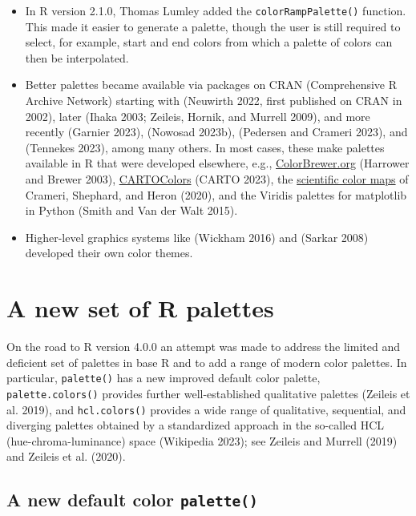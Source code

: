 \begin{itemize}
\item
  In R version 2.1.0, Thomas Lumley added the \texttt{colorRampPalette()} function.
  This made it easier to generate a palette, though the user is still required
  to select, for example, start and end colors from which
  a palette of colors can then be interpolated.
\item
  Better palettes became available via packages on CRAN
  (Comprehensive R Archive Network)
  starting with  (Neuwirth 2022, first published on CRAN in 2002),
  later
   (Ihaka 2003; Zeileis, Hornik, and Murrell 2009), and
  more recently
   (Garnier 2023),  (Nowosad 2023b),
   (Pedersen and Crameri 2023), and
   (Tennekes 2023),
  among many others. In most cases, these make palettes available in R that
  were developed elsewhere, e.g.,
  \href{https://ColorBrewer2.org/}{ColorBrewer.org} (Harrower and Brewer 2003),
  \href{https://carto.com/carto-colors/}{CARTOColors} (CARTO 2023),
  the \href{https://www.fabiocrameri.ch/colourmaps/}{scientific color maps} of Crameri, Shephard, and Heron (2020),
  and the Viridis palettes for matplotlib in Python (Smith and Van der Walt 2015).
\item
  Higher-level graphics systems
  like  (Wickham 2016) and  (Sarkar 2008)
  developed their own color themes.
\end{itemize}

\hypertarget{a-new-set-of-r-palettes}{%
\section{A new set of R palettes}\label{a-new-set-of-r-palettes}}

On the road to R version 4.0.0 an attempt was made to
address the limited and deficient set of palettes in base R
and to add a range of modern color palettes.
In particular, \texttt{palette()} has a new improved default color palette,
\texttt{palette.colors()} provides further well-established qualitative palettes (Zeileis et al. 2019), and
\texttt{hcl.colors()} provides a wide range of qualitative, sequential, and diverging palettes obtained by a standardized approach in
the so-called HCL (hue-chroma-luminance) space (Wikipedia 2023); see Zeileis and Murrell (2019) and Zeileis et al. (2020).

\hypertarget{a-new-default-color-palette}{%
\subsection{\texorpdfstring{A new default color \texttt{palette()}}{A new default color palette()}}\label{a-new-default-color-palette}}

